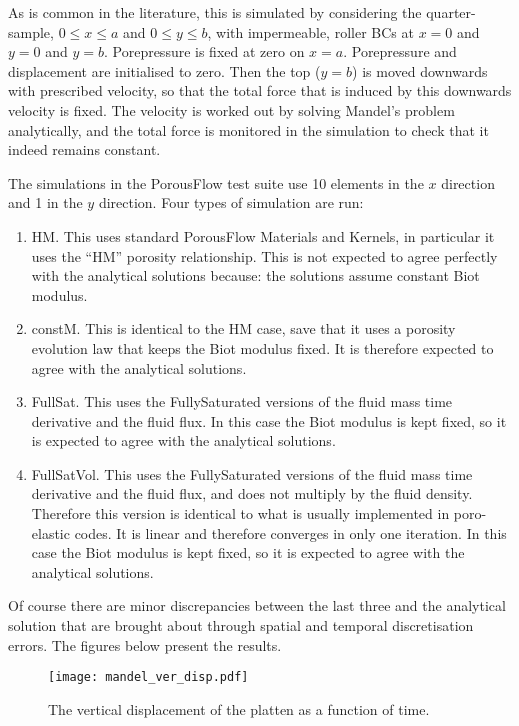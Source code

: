 \documentclass[]{scrreprt}
\begin{document}
As is common in the literature, this is simulated by considering the
quarter-sample, $0\leq x \leq a$ and $0\leq y\leq b$, with
impermeable, roller BCs at $x=0$ and $y=0$ and $y=b$.  Porepressure is
fixed at zero on $x=a$.  Porepressure and displacement are initialised
to zero.  Then the top ($y=b$) is moved downwards with prescribed
velocity, so that the total force that is induced by this downwards
velocity is fixed.  The velocity is worked out by solving Mandel's
problem analytically, and the total force is monitored in the
simulation to check that it indeed remains constant.

The simulations in the PorousFlow test suite use 10 elements in the
$x$ direction and 1 in the $y$ direction.  Four types of simulation
are run:
\begin{enumerate}
\item HM.  This uses standard PorousFlow Materials and Kernels, in
  particular it uses the ``HM'' porosity relationship.  This is not
  expected to agree perfectly with the analytical solutions because:
  the solutions assume constant Biot modulus.
\item constM.  This is identical to the HM case, save that it uses a
  porosity evolution law that keeps the Biot modulus fixed.  It is
  therefore expected to agree with the analytical solutions.
\item FullSat.  This uses the FullySaturated versions of the fluid
  mass time derivative and the fluid flux.  In this case the Biot
  modulus is kept fixed, so it is expected to agree with the
  analytical solutions.
\item FullSatVol.  This uses the FullySaturated versions of the fluid
  mass time derivative and the fluid flux, and does not multiply by
  the fluid density.  Therefore this version is identical to what is
  usually implemented in poro-elastic codes.  It is linear and
  therefore converges in only one iteration.  In this case the Biot
  modulus is kept fixed, so it is expected to agree with the
  analytical solutions.
\end{enumerate}
Of course there are minor discrepancies between the last three and the
analytical solution that are brought about through spatial and
temporal discretisation errors.  The figures below present the
results.

\begin{figure}[htb]
\begin{center}
\texttt{[image: mandel\_ver\_disp.pdf]}
\caption{The vertical displacement of the platten as a function of time.}
\label{mandel_ver_disp.fig}
\end{center}
\end{figure}
\end{document}
